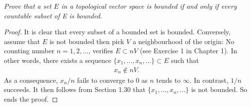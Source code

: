 \textit{
Prove that a set $E$ in a topological vector space is bounded if and only if %
every countable subset of E is bounded.
}
\begin{proof}
It is clear that every subset of a bounded set is bounded. %
Conversely, assume that $E$ is not bounded then pick $V$ %
a neighbourhood of the origin: %
%
No counting number $n=1, 2, \dots$, verifies %
%
  $E\subset nV$ (see Exercise 1 in Chapter 1). %
%
In other words, there exists a sequence %
%
  $\{x_1, \dots, x_n, \dots\} \subset E$ %
%
such that %
%
\begin{align}
  x_n \notin nV.
\end{align}
%
As a consequence, $x_n /n $ fails to converge to $0$ %
as $n$ tends to $\infty $. %
In contrast, $1/n$ succeeds. %
It then follows from Section 1.30 that %
%
  $\{x_1, \dots, x_n, \dots\}$ %
%
is not bounded. So ends the proof.
\end{proof}
